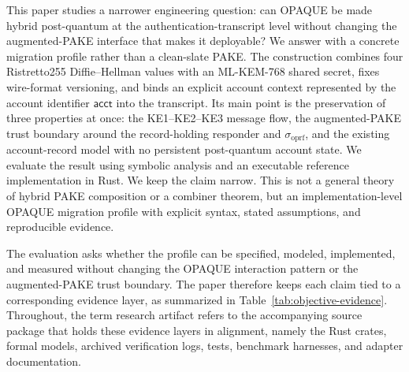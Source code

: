 \documentclass{ieeeijc}
\newcommand{\acct}{\mathsf{acct}}
\newcommand{\sigoprf}{\sigma_{\mathrm{oprf}}}
\theoremstyle{remark}
\begin{document}
This paper studies a narrower engineering question: can OPAQUE be made hybrid
post-quantum at the authentication-transcript level without changing the
augmented-PAKE interface that makes it deployable? We answer with a concrete
migration profile rather than a clean-slate PAKE. The construction combines four
Ristretto255 Diffie--Hellman values with an ML-KEM-768 shared secret, fixes
wire-format versioning, and binds an explicit account context represented by the
account identifier $\acct$ into the transcript. Its main point is the
preservation of three properties at once: the KE1--KE2--KE3 message flow, the
augmented-PAKE trust boundary around the record-holding responder and
$\sigoprf$, and the existing account-record model with no persistent
post-quantum account state. We evaluate the result using symbolic analysis and
an executable reference implementation in Rust. We keep the claim narrow.
This is not a general theory of hybrid PAKE composition or a combiner
theorem, but an implementation-level OPAQUE migration profile with explicit
syntax, stated assumptions, and reproducible evidence.

The evaluation asks whether the profile can be specified, modeled, implemented,
and measured without changing the OPAQUE interaction pattern or the augmented-PAKE
trust boundary. The paper therefore keeps each claim tied to a corresponding
evidence layer, as summarized in Table~\ref{tab:objective-evidence}. Throughout,
the term research artifact refers to the accompanying source package that holds
these evidence layers in alignment, namely the Rust crates, formal models,
archived verification logs, tests, benchmark harnesses, and adapter
documentation.
\end{document}
